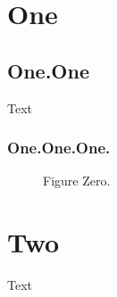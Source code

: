 \documentclass{report}
\begin{document}
\clearpage
{}

\clearpage

\listoffigures
\clearpage



\tableofcontents


\chapter{One}
\section{One.One}
Text
\subsection{One.One.One.}
\begin{figure}
\caption[Figure Zero]{Figure Zero.}
\end{figure}
\chapter{Two}
Text
\end{document}
